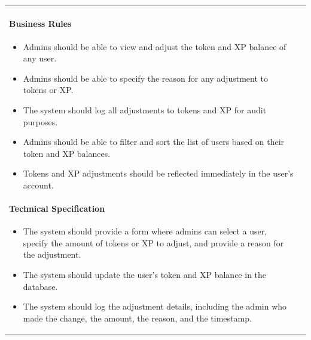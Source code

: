 \begin{longtable}{ | m{} | m{} | }
    \paragraph*{Business Rules} \mbox{} \newline
    \begin{itemize}
        \item Admins should be able to view and adjust the token and XP balance of any user.
        \item Admins should be able to specify the reason for any adjustment to tokens or XP.
        \item The system should log all adjustments to tokens and XP for audit purposes.
        \item Admins should be able to filter and sort the list of users based on their token and XP balances.
        \item Tokens and XP adjustments should be reflected immediately in the user's account.
    \end{itemize}
    
    \paragraph*{Technical Specification} \mbox{} \newline
    \begin{itemize}
        \item The system should provide a form where admins can select a user, specify the amount of tokens or XP to adjust, and provide a reason for the adjustment.
        \item The system should update the user's token and XP balance in the database.
        \item The system should log the adjustment details, including the admin who made the change, the amount, the reason, and the timestamp.
    \end{itemize}
    

\end{longtable}
